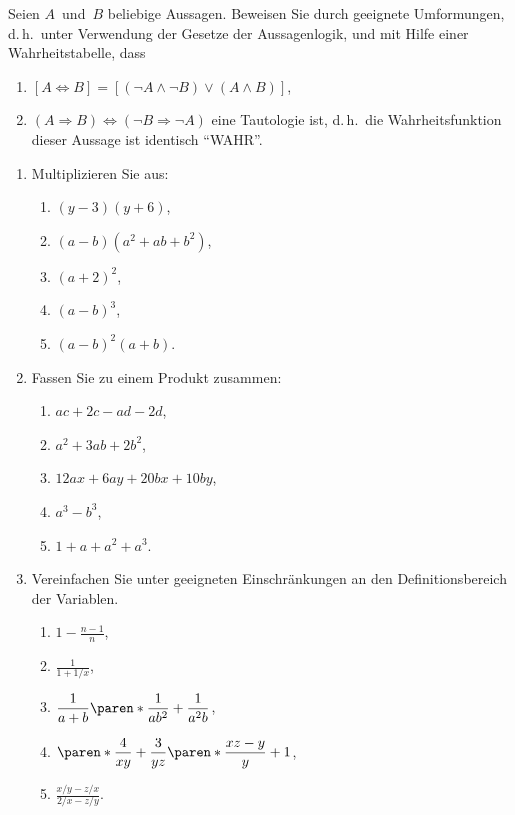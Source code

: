 \documentclass[a4paper]{article}
\begin{document}
    \begin{problem}[B01.A3]
    Seien $A$~und~$B$ beliebige Aussagen. Beweisen Sie durch geeignete Umformungen, d.\,h.\ unter Verwendung der Gesetze der Aussagenlogik, und mit Hilfe einer Wahrheitstabelle, dass
    \begin{enumerate}
        \item $[A \Leftrightarrow B] = [(\neg A \wedge \neg B) \vee (A \wedge B)]$,
        \item $(A \Rightarrow B) \Leftrightarrow (\neg B \Rightarrow \neg A)$ eine Tautologie ist, d.\,h.\ die Wahrheitsfunktion dieser Aussage ist identisch "`WAHR"'.
    \end{enumerate}
    \end{problem}

    \begin{problem}[B01.P1]\leavevmode
    \begin{enumerate}
        \item Multiplizieren Sie aus:
              \begin{enumerate}
                  \item $(y-3) (y+6)$,
                  \item $(a-b) (a^2 + ab + b^2)$,
                  \item $(a+2)^2$,
                  \item $(a-b)^3$,
                  \item $(a-b)^2 (a+b)$.
              \end{enumerate}
        \item Fassen Sie zu einem Produkt zusammen:
              \begin{enumerate}
                  \item $ac + 2c - ad - 2d$,
                  \item $a^2 + 3ab + 2b^2$,
                  \item $12ax + 6ay + 20bx + 10by$,
                  \item $a^3 - b^3$,
                  \item $1 + a + a^2 + a^3$.
              \end{enumerate}
        \item Vereinfachen Sie unter geeigneten Einschränkungen an den Definitionsbereich der Variablen.
              \begin{enumerate}
                  \item $\displaystyle 1-\frac{n-1}{n}$,
                  \item $\displaystyle \frac{1}{1 + 1/x}$,
                  \item $\displaystyle \frac{1}{a+b} \paren*{\frac{1}{ab^2} + \frac{1}{a^2b}}$,
                  \item $\displaystyle \paren*{\frac{4}{xy} + \frac{3}{yz}} \paren*{\frac{xz-y}{y} + 1}$,
                  \item $\displaystyle \frac{x/y - z/x}{2/x - z/y}$.
              \end{enumerate}
    \end{enumerate}
    \end{problem}
\end{document}
